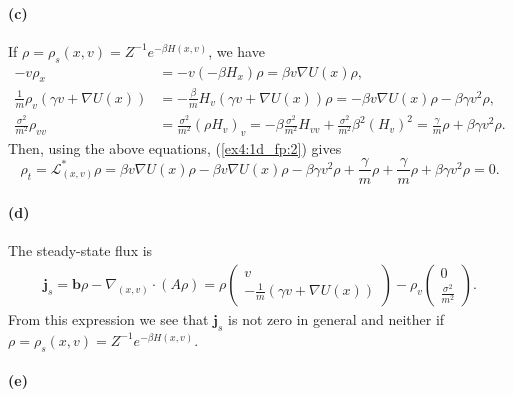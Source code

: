 \documentclass[a4paper,11pt]{article}
\theoremstyle{definition}
\theoremstyle{plain}
\theoremstyle{remark}
\begin{document}
\paragraph*{(c)}

If $\rho = \rho_s(x,v) = Z^{-1}e^{-\beta H(x,v)}$, we have
\begin{align*}
-v\rho_x & = -v(-\beta H_x)\rho = \beta v \nabla U(x)\rho,
\\ \frac{1}{m}\rho_v(\gamma v + \nabla U(x)) & = -\frac{\beta}{m}H_v(\gamma v + \nabla U(x))\rho = -\beta v\nabla U(x)\rho - \beta\gamma v^2\rho,
\\ \frac{\sigma^2}{m^2}\rho_{vv} & = \frac{\sigma^2}{m^2}(\rho H_v)_v = -\beta\frac{\sigma^2}{m^2} H_{vv} +\frac{\sigma^2}{m^2}\beta^2(H_v)^2 = \frac{\gamma}{m}\rho + \beta\gamma v^2\rho.
\end{align*}
Then, using the above equations, (\ref{ex4:1d_fp:2}) gives
$$
\rho_t = \mathcal{L}^*_{(x,v)} \rho = \beta v \nabla U(x)\rho -\beta v\nabla U(x)\rho - \beta\gamma v^2\rho + \frac{\gamma}{m}\rho + \frac{\gamma}{m}\rho + \beta\gamma v^2\rho = 0.
$$

\paragraph*{(d)}

The steady-state flux is 
\begin{align*}
\mathbf{j}_s = \mathbf{b}\rho - \nabla_{(x,v)}\cdot(A\rho) = \rho\left(\begin{matrix}
v \\ -\frac{1}{m}(\gamma v + \nabla U(x))
\end{matrix}\right) - \rho_v\left(\begin{matrix}
0 \\ \frac{\sigma^2}{m^2}
\end{matrix}\right).
\end{align*}
From this expression we see that $\mathbf{j}_s$ is not zero in general and neither if $\rho = \rho_s(x,v) = Z^{-1}e^{-\beta H(x,v)}$.

\paragraph*{(e)} 
\end{document}
